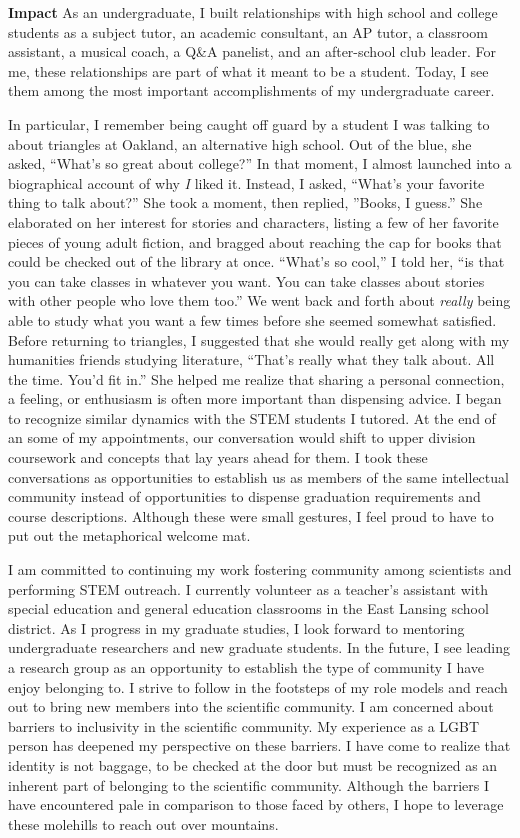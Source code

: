 \textbf{Impact}
As an undergraduate, I built relationships with high school and college students as a subject tutor, an academic consultant, an AP tutor, a classroom assistant, a musical coach, a Q\&A panelist, and an after-school club leader.
For me, these relationships are part of what it meant to be a student.
Today, I see them among the most important accomplishments of my undergraduate career.

In particular, I remember being caught off guard by a student I was talking to about triangles at Oakland, an alternative high school.
Out of the blue, she asked, ``What's so great about college?''
In that moment, I almost launched into a biographical account of why \textit{I} liked it.
Instead, I asked, ``What's your favorite thing to talk about?''
She took a moment, then replied, ''Books, I guess.''
She elaborated on her interest for stories and characters, listing a few of her favorite pieces of young adult fiction, and bragged about reaching the cap for books that could be checked out of the library at once.
``What's so cool,'' I told her, ``is that you can take classes in whatever you want.
You can take classes about stories with other people who love them too.''
We went back and forth about \textit{really} being able to study what you want a few times before she seemed somewhat satisfied.
Before returning to triangles, I suggested that she would really get along with my humanities friends studying literature,
``That's really what they talk about.
All the time.
You'd fit in.''
She helped me realize that sharing a personal connection, a feeling, or enthusiasm is often more important than dispensing advice.
I began to recognize similar dynamics with the STEM students I tutored.
At the end of an some of my appointments, our conversation would shift to upper division coursework  and concepts that lay years ahead for them.
I took these conversations as opportunities to establish us as members of the same intellectual community instead of opportunities to dispense graduation requirements and course descriptions.
Although these were small gestures, I feel proud to have to put out the metaphorical welcome mat.

I am committed to continuing my work fostering community among scientists and performing STEM outreach.
I currently volunteer as a teacher's assistant with special education and general education classrooms in the East Lansing school district.
As I progress in my graduate studies, I look forward to mentoring undergraduate researchers and new graduate students.
In the future, I see leading a research group as an opportunity to establish the type of community I have enjoy belonging to.
I strive to follow in the footsteps of my role models and reach out to bring new members into the scientific community.
I am concerned about barriers to inclusivity in the scientific community.
My experience as a LGBT person has deepened my perspective on these barriers.
I have come to realize that identity is not baggage, to be checked at the door but must be recognized as an inherent part of belonging to the scientific community.
Although the barriers I have encountered pale in comparison to those faced by others, I hope to leverage these molehills to reach out over mountains.
